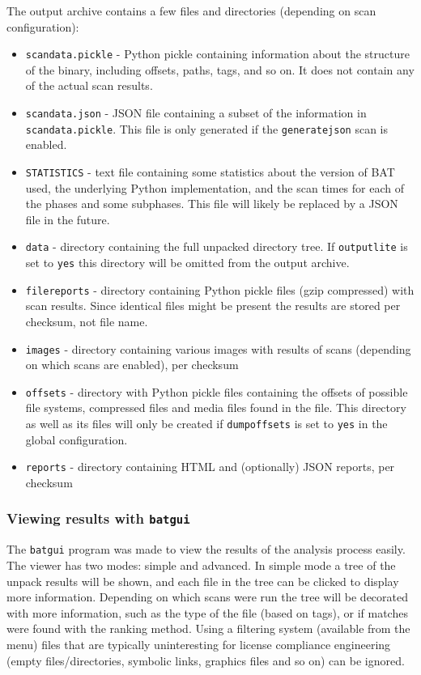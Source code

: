 \documentclass[10pt,a4paper]{article}
\begin{document}
The output archive contains a few files and directories (depending on scan
configuration):

\begin{itemize}
\item \texttt{scandata.pickle} - Python pickle containing information about the
structure of the binary, including offsets, paths, tags, and so on. It does not
contain any of the actual scan results.
\item \texttt{scandata.json} - JSON file containing a subset of
the information in \texttt{scandata.pickle}. This file is only generated if the
\texttt{generatejson} scan is enabled.
\item \texttt{STATISTICS} - text file containing some statistics about the
version of BAT used, the underlying Python implementation, and the scan times
for each of the phases and some subphases. This file will likely be replaced
by a JSON file in the future.
\item \texttt{data} - directory containing the full unpacked directory tree.
If \texttt{outputlite} is set to \texttt{yes} this directory will be omitted
from the output archive.
\item \texttt{filereports} - directory containing Python pickle files (gzip
compressed) with scan results. Since identical files might be present the
results are stored per checksum, not file name.
\item \texttt{images} - directory containing various images with results of
scans (depending on which scans are enabled), per checksum
\item \texttt{offsets} - directory with Python pickle files containing the
offsets of possible file systems, compressed files and media files found in
the file. This directory as well as its files will only be created if
\texttt{dumpoffsets} is set to \texttt{yes} in the global configuration.
\item \texttt{reports} - directory containing HTML and (optionally) JSON
reports, per checksum
\end{itemize}

\subsubsection{Viewing results with \texttt{batgui}}

The \texttt{batgui} program was made to view the results of the analysis
process easily. The viewer has two modes: simple and advanced. In simple mode
a tree of the unpack results will be shown, and each file in the tree can be
clicked to display more information. Depending on which scans were run the tree
will be decorated with more information, such as the type of the file (based on
tags), or if matches were found with the ranking method. Using a filtering
system (available from the menu) files that are typically uninteresting for
license compliance engineering (empty files/directories, symbolic links,
graphics files and so on) can be ignored.
\end{document}
